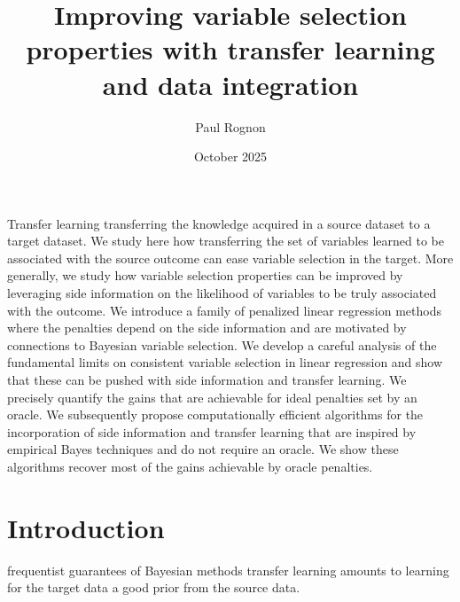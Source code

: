 \documentclass{article}
\title{Improving variable selection properties with transfer learning and data integration}
\author{Paul Rognon}
\date{October 2025}
\begin{document}
\maketitle

Transfer learning transferring the knowledge acquired in a source dataset to a 
target dataset. We study here how transferring the set of variables learned to be associated with the source outcome can ease variable selection in the target. 
More generally, we study how variable selection properties can be improved by leveraging side information on the likelihood of variables to be truly associated 
with the outcome. We introduce a family of penalized linear regression methods where the penalties depend on the side information and are motivated by connections 
to Bayesian variable selection. We develop a careful analysis of the fundamental limits on consistent variable selection in linear regression and show that these 
can be pushed with side information and transfer learning. We precisely quantify the gains that are achievable for ideal penalties set by an oracle. We subsequently 
propose computationally efficient algorithms for the incorporation of side information and transfer learning that are inspired by empirical Bayes techniques and do 
not require an oracle. We show these algorithms recover most of the gains achievable by oracle penalties.  

\section{Introduction}

frequentist guarantees of Bayesian methods
transfer learning amounts to learning for the target data a good prior from the source data.  
\end{document}
